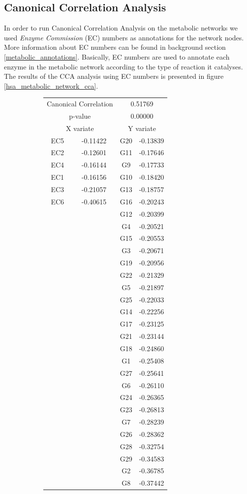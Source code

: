 \subsection{Canonical Correlation Analysis}

In order to run Canonical Correlation Analysis on the metabolic networks we used \emph{Enzyme Commission} (EC) numbers as annotations for the network nodes. More information about EC numbers can be found in background section \ref{metabolic_annotations}. Basically, EC numbers are used to annotate each enzyme in the metabolic network according to the type of reaction it catalyses. The results of the CCA analysis using EC numbers is presented in figure \ref{hsa_metabolic_network_cca}.

\begin{figure}
  \begin{subfigure}{.65\textwidth}
  \centering
  \begin{tabular}{ c c | c c }
    \multicolumn{2}{c}{Canonical Correlation} &  \multicolumn{2}{c}{0.51769} \\
    \multicolumn{2}{c}{p-value} &  \multicolumn{2}{c}{0.00000} \\
    \hline
    \multicolumn{2}{c}{X variate} & \multicolumn{2}{c}{Y variate}\\
    \hline
  EC5 & -0.11422 &  G20 & -0.13839\\
  EC2 & -0.12601 &  G11 & -0.17646\\
  EC4 & -0.16144 &  G9 & -0.17733\\
  EC1 & -0.16156 &  G10 & -0.18420\\
  EC3 & -0.21057 &  G13 & -0.18757\\
  EC6 & -0.40615 &  G16 & -0.20243\\
  & &  G12 & -0.20399\\
  & &  G4 & -0.20521\\
  & &  G15 & -0.20553\\
  & &  G3 & -0.20671\\
  & &  G19 & -0.20956\\
  & &  G22 & -0.21329\\
  & &  G5 & -0.21897\\
  & &  G25 & -0.22033\\
  & &  G14 & -0.22256\\
  & &  G17 & -0.23125\\
  & &  G21 & -0.23144\\
  & &  G18 & -0.24860\\
  & &  G1 & -0.25408\\
  & &  G27 & -0.25641\\
  & &  G6 & -0.26110\\
  & &  G24 & -0.26365\\
  & &  G23 & -0.26813\\
  & &  G7 & -0.28239\\
  & &  G26 & -0.28362\\
  & &  G28 & -0.32754\\
  & &  G29 & -0.34583\\
  & &  G2 & -0.36785\\
  & &  G8 & -0.37442\\
  \end{tabular}


\end{subfigure}
\end{figure}
